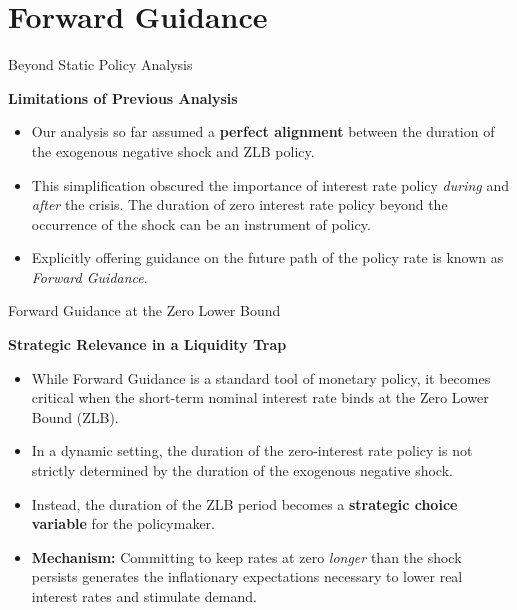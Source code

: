 \documentclass[11pt,aspectratio=169]{beamer}
\begin{document}
\section{Forward Guidance}

\begin{frame}[label=ChapterFWG]{Beyond Static Policy Analysis}
\small

\textbf{Limitations of Previous Analysis}
\begin{itemize}
    \item Our analysis so far assumed a \textbf{perfect alignment} between the duration of the exogenous negative shock and ZLB policy.
    \item This simplification obscured the importance of interest rate policy \textit{during} and \textit{after} the crisis. The duration of zero interest rate policy beyond the occurrence of the shock can be an instrument of policy.
    \item Explicitly offering guidance on the future path of the policy rate is known as \textit{Forward Guidance}.
\end{itemize}
\end{frame}

\begin{frame}{Forward Guidance at the Zero Lower Bound}
\small

\textbf{Strategic Relevance in a Liquidity Trap}
\begin{itemize}
    \item While Forward Guidance is a standard tool of monetary policy, it becomes critical when the short-term nominal interest rate binds at the Zero Lower Bound (ZLB).
    \item In a dynamic setting, the duration of the zero-interest rate policy is not strictly determined by the duration of the exogenous negative shock.
    \item Instead, the duration of the ZLB period becomes a \textbf{strategic choice variable} for the policymaker.
    \item \textbf{Mechanism:} Committing to keep rates at zero \textit{longer} than the shock persists generates the inflationary expectations necessary to lower real interest rates and stimulate demand.
\end{itemize}
\end{frame}
\end{document}

